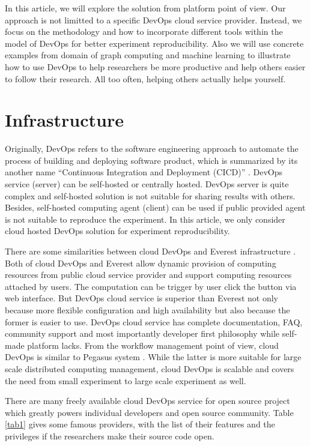 \documentclass{IEEEcsmag}
\begin{document}
In this article, we will explore the solution from platform point of view. Our approach is not limitted to a specific DevOps cloud service provider. Instead, we focus on the methodology and how to incorporate different tools within the model of DevOps for better experiment reproducibility. 
Also we will use concrete examples from domain of graph computing and machine learning to illustrate how to use DevOps to help researchers be more productive and help others easier to follow their research. All too often, helping others actually helps yourself.

\section{Infrastructure}
Originally, DevOps refers to the software engineering approach to automate the process of building and deploying software product, which is summarized by its another name ``Continuous Integration and Deployment (CICD)'' \cite{bass2015devops}. 
DevOps service (server) can be self-hosted or centrally hosted. DevOps server is quite complex and self-hosted solution is not suitable for sharing results with others. Besides, self-hosted computing agent (client) can be used if public provided agent is not suitable to reproduce the experiment. In this article, we only consider cloud hosted DevOps solution for experiment reproducibility.

There are some similarities between cloud DevOps and Everest infrastructure \cite{GavishD12} . Both of cloud DevOps and Everest allow dynamic provision of computing resources from public cloud service provider and support computing resources attached by users. The computation can be trigger by user click the button via web interface. But DevOps cloud service is superior than Everest not only because more flexible configuration and high availability but also because the former is easier to use. DevOps cloud service has complete documentation, FAQ, community support and most importantly developer first philosophy while self-made platform lacks.  From the workflow management point of view, cloud DevOps is similar to Pegasus system \cite{Pegasus}. While the latter is more suitable for large scale distributed computing management, cloud DevOps is scalable and covers the need from small experiment to large scale experiment as well.

There are many freely available cloud DevOps service for open source project which greatly powers individual developers and open source community. Table \ref{tab1} gives some famous providers, with the list of their features and the privileges if the researchers make their source code open.
\end{document}

